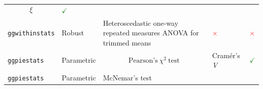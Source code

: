 \documentclass[]{article}
\begin{document}
\begin{longtable}[]{@{}lllll@{}}
\begin{minipage}[t]{0.12\columnwidth}
\[\xi\]\strut
\end{minipage} & \begin{minipage}[t]{0.07\columnwidth}\raggedright
\textcolor{ForestGreen}{$\checkmark$}\strut
\end{minipage}\tabularnewline
\begin{minipage}[t]{0.20\columnwidth}\raggedright
\texttt{ggwithinstats}\strut
\end{minipage} & \begin{minipage}[t]{0.16\columnwidth}\raggedright
Robust\strut
\end{minipage} & \begin{minipage}[t]{0.31\columnwidth}\raggedright
Heteroscedastic one-way repeated measures ANOVA for trimmed means\strut
\end{minipage} & \begin{minipage}[t]{0.12\columnwidth}\raggedright
\textcolor{red}{$\times$}\strut
\end{minipage} & \begin{minipage}[t]{0.07\columnwidth}\raggedright
\textcolor{red}{$\times$}\strut
\end{minipage}\tabularnewline
\begin{minipage}[t]{0.20\columnwidth}\raggedright
\texttt{ggpiestats}\strut
\end{minipage} & \begin{minipage}[t]{0.16\columnwidth}\raggedright
Parametric\strut
\end{minipage} & \begin{minipage}[t]{0.31\columnwidth}\raggedright
\[\text{Pearson's}~ \chi^2 ~\text{test}\]\strut
\end{minipage} & \begin{minipage}[t]{0.12\columnwidth}\raggedright
Cramér's \emph{V}\strut
\end{minipage} & \begin{minipage}[t]{0.07\columnwidth}\raggedright
\textcolor{ForestGreen}{$\checkmark$}\strut
\end{minipage}\tabularnewline
\begin{minipage}[t]{0.20\columnwidth}\raggedright
\texttt{ggpiestats}\strut
\end{minipage} & \begin{minipage}[t]{0.16\columnwidth}\raggedright
Parametric\strut
\end{minipage} & \begin{minipage}[t]{0.31\columnwidth}\raggedright
McNemar's test\strut
\end{minipage} & \begin{minipage}[t]{0.12\columnwidth}\raggedright

\end{minipage}
\end{longtable}
\end{document}
